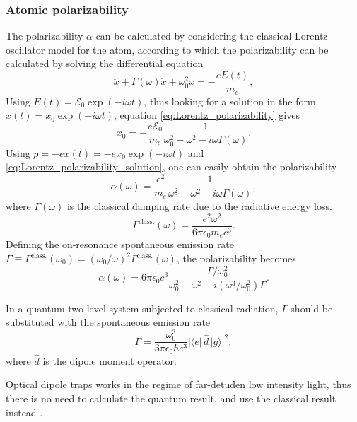 \subsubsection{Atomic polarizability}
The polarizability $\alpha$ can be calculated by considering the classical Lorentz oscillator model for the atom, according to which the polarizability can be calculated by solving the differential equation
\begin{equation}
    \label{eq:Lorentz_polarizability}
    \ddot{x}+\Gamma(\omega) \dot{x} + \omega_0^2x = -\frac{eE(t)}{m_e},
\end{equation}
Using $E(t)=\mathcal{E}_0\exp(-i\omega t)$, thus looking for a solution in the form $x(t)=x_0\exp(-i\omega t)$, equation \eqref{eq:Lorentz_polarizability} gives
\begin{equation}
    \label{eq:Lorentz_polarizability_solution}
    x_0 = - \frac{e\mathcal{E}_0}{m_e} \frac{1}{\omega_0^2 -\omega^2 -i\omega\Gamma(\omega)}.
\end{equation}
Using $p= -ex(t)=-ex_0\exp(-i\omega t)$ and \eqref{eq:Lorentz_polarizability_solution}, one can easily obtain the polarizability
\begin{equation}
    \alpha(\omega) = \frac{e^2}{m_e} \frac{1}{\omega_0^2 -\omega^2 -i\omega\Gamma(\omega)},
\end{equation}
where $\Gamma(\omega)$ is the classical damping rate due to the radiative energy loss. 
\begin{equation}
    \Gamma^\text{class.}(\omega) = \frac{e^2 \omega^2}{6 \pi \epsilon_0 m_e c^3}.
\end{equation}
Defining the on-resonance spontaneous emission rate $\Gamma\equiv  \Gamma^\text{class.}(\omega_0) = (\omega_0/\omega)^2\Gamma^\text{class.}(\omega)$, the polarizability becomes
\begin{equation}
    \label{eq:polarizability}
    \alpha(\omega) = 6 \pi \epsilon_0 c^3 \frac{\Gamma / \omega_0^2}{\omega_0^2 - \omega^2 - i (\omega^3 / \omega_0^2) \Gamma}.
\end{equation}

In a quantum two level system subjected to classical radiation, $\Gamma$ should be substituted with the spontaneous emission rate
\begin{equation}
    \label{eq:quantum_gamma}
    \Gamma = \frac{\omega_0^3}{3\pi\epsilon_0\hbar c^3}|\langle e|\,\hat{d}\,|g\rangle|^2,
\end{equation}
where $\hat{d}$ is the dipole moment operator.

Optical dipole traps works in the regime of far-detuden low intensity light, thus there is no need to calculate the quantum result, and use the classical result instead \cite{grimm}.

